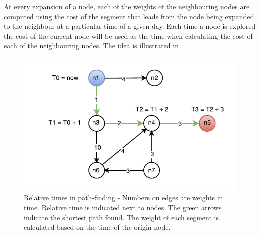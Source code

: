 At every expansion of a node, each of the weights of the neighbouring nodes are computed using the cost of the segment that leads from the node being expanded to the neighbour at a particular time of a given day. Each time a node is explored the cost of the current node will be used as the time when calculating the cost of each of the neighbouring nodes. The idea is illustrated in  .
\begin{figure}[h]
\centering
\includegraphics[width=\linewidth]{figures/timed-graph}
\caption{Relative times in path-finding - Numbers on edges are weights in time. Relative time is indicated next to nodes. The green arrows indicate the shortest path found. The weight of each segment is calculated based on the time of the origin node.}
\label{fig:timed-graph}
\end{figure}





